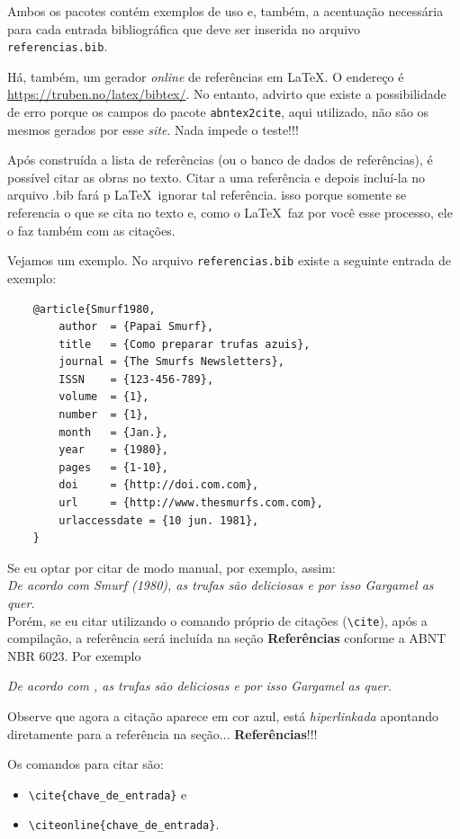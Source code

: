\documentclass[a4paper,12pt,oneside,openright,extrafontsizes,openbib]{memoir}
\begin{document}
{{Ambos os pacotes contém exemplos de uso e, também, a acentuação necessária para cada entrada bibliográfica que deve ser inserida no arquivo \verb|referencias.bib|.

Há, também, um gerador \textit{online} de referências em \LaTeX. O endereço é \url{https://truben.no/latex/bibtex/}. No entanto, advirto que existe a possibilidade de erro porque os campos do pacote \verb|abntex2cite|, aqui utilizado, não são os mesmos gerados por esse \textit{site}. Nada impede o teste!!!

Após construída a lista de referências (ou o banco de dados de referências), é possível citar as obras no texto. Citar  a uma referência e depois incluí-la no arquivo .bib fará p \LaTeX\ ignorar tal referência. isso porque somente se referencia o que se cita no texto e, como o \LaTeX\ faz por você esse processo, ele o faz também com as citações.

Vejamos um exemplo. No arquivo \verb|referencias.bib| existe a seguinte entrada de exemplo:

\begin{verbatim}
	@article{Smurf1980,
		author  = {Papai Smurf},
		title   = {Como preparar trufas azuis},
		journal = {The Smurfs Newsletters},
		ISSN    = {123-456-789},
		volume  = {1},
		number  = {1},
		month   = {Jan.},
		year    = {1980},
		pages   = {1-10},
		doi     = {http://doi.com.com},
		url     = {http://www.thesmurfs.com.com},
		urlaccessdate = {10 jun. 1981},
	}
\end{verbatim}

Se eu optar por citar de modo manual, por exemplo, assim: 
\ \\

\textit{De acordo com Smurf (1980), as trufas são deliciosas e por isso Gargamel as quer.}
\ \\
Porém, se eu citar utilizando o comando próprio de citações (\verb|\cite|), após a compilação, a referência será incluída na seção \textbf{Referências} conforme a ABNT NBR 6023. Por exemplo

\textit{De acordo com \cite{Smurf1980}, as trufas são deliciosas e por isso Gargamel as quer.}

Observe que agora a citação aparece em cor azul, está \textit{hiperlinkada} apontando diretamente para a referência na seção... \textbf{Referências}!!!

Os comandos para citar são: 
\begin{itemize}
	\item \verb|\cite{chave_de_entrada}| e 
	\item \verb|\citeonline{chave_de_entrada}|. 
\end{itemize}

}}
\end{document}

